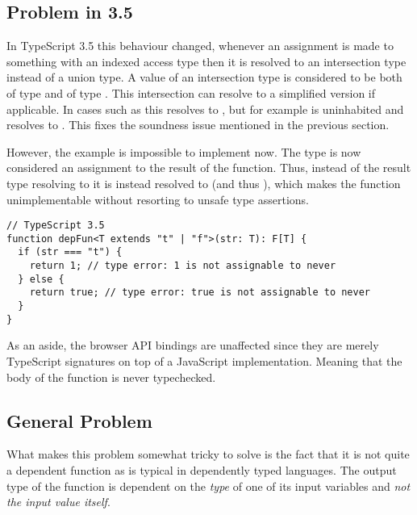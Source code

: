 % 

\subsection{Problem in 3.5}

In TypeScript 3.5 this behaviour changed, whenever an assignment is made to something with an indexed access type then it is resolved to an intersection type instead of a union type. A value of an intersection type  is considered to be both of type  and of type . This intersection can resolve to a simplified version if applicable. In cases such as  this resolves to , but for example  is uninhabited and resolves to . This fixes the soundness issue mentioned in the previous section.

However, the  example is impossible to implement now. The type  is now considered an assignment to the result of the function. Thus, instead of the result type resolving to  it is instead resolved to  (and thus ), which makes the function unimplementable without resorting to unsafe type assertions.

\begin{lstlisting}
// TypeScript 3.5
function depFun<T extends "t" | "f">(str: T): F[T] {
  if (str === "t") {
    return 1; // type error: 1 is not assignable to never
  } else {
    return true; // type error: true is not assignable to never
  }
}
\end{lstlisting}

As an aside, the browser API bindings are unaffected since they are merely TypeScript signatures on top of a JavaScript implementation. Meaning that the body of the function is never typechecked.

\subsection{General Problem}

What makes this problem somewhat tricky to solve is the fact that it is not quite a dependent function as is typical in dependently typed languages. The output type of the function is dependent on the \emph{type} of one of its input variables and \emph{not the input value itself}.

